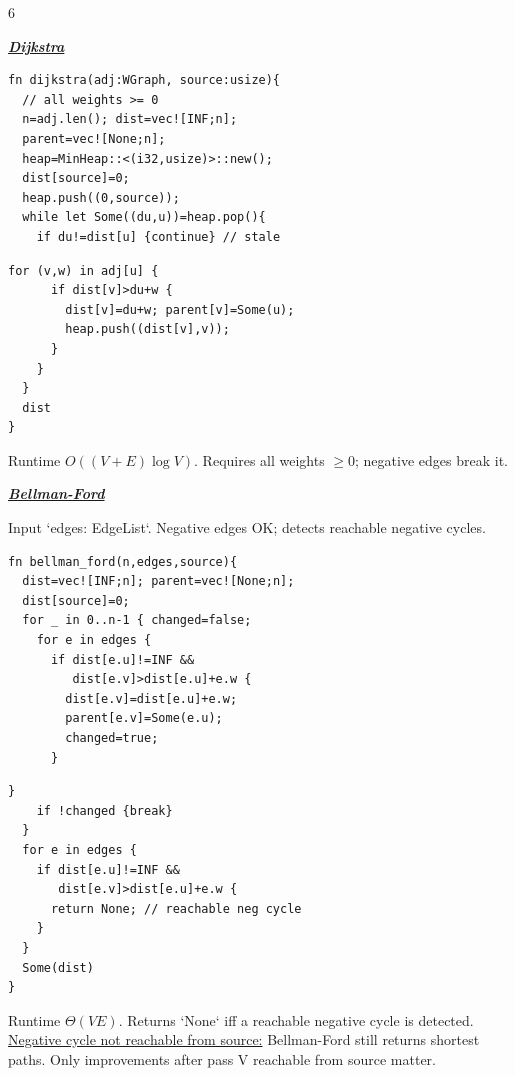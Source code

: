 \documentclass[a4paper,landscape]{article}
\renewcommand{\textbf}[1]{\underline{#1}}
\newcommand{\subsectionsize}{\fontsize{3.92}{4.02}\selectfont}
\newcommand{\subsectiontitle}[1]{%
  \par\vspace{0pt}%
  {\subsectionsize\bfseries\itshape\textbf{#1}}\par%
  \vspace{0pt}%
}
\begin{document}
\begin{multicols*}{6}
\subsectiontitle{Dijkstra}
\noindent
\begin{minipage}[t]{0.49\linewidth}\vspace{0pt}
\begin{lstlisting}[aboveskip=0pt,belowskip=0pt]
fn dijkstra(adj:WGraph, source:usize){
  // all weights >= 0
  n=adj.len(); dist=vec![INF;n];
  parent=vec![None;n];
  heap=MinHeap::<(i32,usize)>::new();
  dist[source]=0;
  heap.push((0,source));
  while let Some((du,u))=heap.pop(){
    if du!=dist[u] {continue} // stale
\end{lstlisting}
\end{minipage}\hfill
\begin{minipage}[t]{0.49\linewidth}\vspace{0pt}
\begin{lstlisting}[aboveskip=0pt,belowskip=0pt]
    for (v,w) in adj[u] {
      if dist[v]>du+w {
        dist[v]=du+w; parent[v]=Some(u);
        heap.push((dist[v],v));
      }
    }
  }
  dist
}
\end{lstlisting}
\end{minipage}
Runtime $O((V+E)\log V)$. Requires all weights $\ge0$; negative edges break it.
\subsectiontitle{Bellman-Ford}
Input `edges: EdgeList`. Negative edges OK; detects reachable negative cycles.
\noindent
\begin{minipage}[t]{0.49\linewidth}\vspace{0pt}
\begin{lstlisting}[aboveskip=0pt,belowskip=0pt]
fn bellman_ford(n,edges,source){
  dist=vec![INF;n]; parent=vec![None;n];
  dist[source]=0;
  for _ in 0..n-1 { changed=false;
    for e in edges {
      if dist[e.u]!=INF &&
         dist[e.v]>dist[e.u]+e.w {
        dist[e.v]=dist[e.u]+e.w;
        parent[e.v]=Some(e.u);
        changed=true;
      }
\end{lstlisting}
\end{minipage}\hfill
\begin{minipage}[t]{0.49\linewidth}\vspace{0pt}
\begin{lstlisting}[aboveskip=0pt,belowskip=0pt]
    }
    if !changed {break}
  }
  for e in edges {
    if dist[e.u]!=INF &&
       dist[e.v]>dist[e.u]+e.w {
      return None; // reachable neg cycle
    }
  }
  Some(dist)
}
\end{lstlisting}
\end{minipage}
Runtime $\Theta(VE)$. Returns `None` iff a reachable negative cycle is detected.
\textbf{Negative cycle not reachable from source:}
Bellman-Ford still returns shortest paths.
Only improvements after pass V reachable from source matter.


\end{multicols*}
\end{document}
